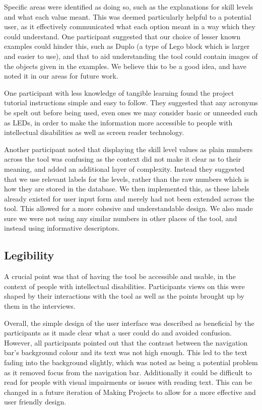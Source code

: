\documentclass{l4proj}
\begin{document}
Specific areas were identified as doing so, such as the explanations for skill levels and what each value meant. This was deemed particularly helpful to a potential user, as it effectively communicated what each option meant in a way which they could understand. One participant suggested that our choice of lesser known examples could hinder this, such as Duplo (a type of Lego block which is larger and easier to use), and that to aid understanding the tool could contain images of the objects given in the examples. We believe this to be a good idea, and have noted it in our areas for future work. 

One participant with less knowledge of tangible learning found the project tutorial instructions simple and easy to follow. They suggested that any acronyms be spelt out before being used, even ones we may consider basic or unneeded such as LEDs, in order to make the information more accessible to people with intellectual disabilities as well as screen reader technology. 

Another participant noted that displaying the skill level values as plain numbers across the tool was confusing as the context did not make it clear as to their meaning, and added an additional layer of complexity. Instead they suggested that we use relevant labels for the levels, rather than the raw numbers which is how they are stored in the database. We then implemented this, as these labels already existed for user input form and merely had not been extended across the tool. This allowed for a more cohesive and understandable design. We also made sure we were not using any similar numbers in other places of the tool, and instead using informative descriptors.  

\subsection{Legibility} 
A crucial point was that of having the tool be accessible and usable, in the context of people with intellectual disabilities. Participants views on this were shaped by their interactions with the tool as well as the points brought up by them in the interviews. 

Overall, the simple design of the user interface was described as beneficial by the participants as it made clear what a user could do and avoided confusion. However, all participants pointed out that the contrast between the navigation bar's background colour and its text was not high enough. This led to the text fading into the background slightly, which was noted as being a potential problem as it removed focus from the navigation bar. Additionally it could be difficult to read for people with visual impairments or issues with reading text. This can be changed in a future iteration of Making Projects to allow for a more effective and user friendly design. 
\end{document}
